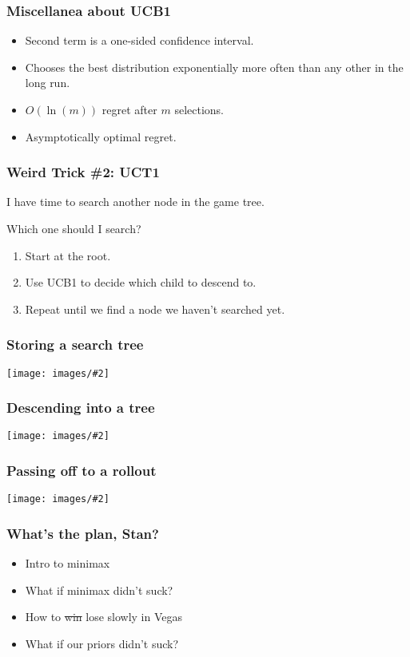 \documentclass[table]{beamer}
\newcommand\img[2]{\texttt{[image: images/\#2]}}
\begin{document}
\begin{frame}
	\frametitle{Miscellanea about UCB1}

	\begin{itemize}
		\item Second term is a one-sided confidence interval.
		\item Chooses the best distribution exponentially more often than
			any other in the long run.
		\item $O(\ln(m))$ regret after $m$ selections.
		\item Asymptotically optimal regret.
	\end{itemize}
\end{frame}

\begin{frame}
	\frametitle{Weird Trick \#2: UCT1}
	I have time to search another node in the game tree.

	Which one should I search?

	\vspace{3ex}

	\begin{enumerate}
		\item Start at the root.
		\item \alert{Use UCB1 to decide which child to descend to.}
		\item Repeat until we find a node we haven't searched yet.
	\end{enumerate}
\end{frame}

\begin{frame}
    \frametitle{Storing a search tree}
    \begin{center}
        \img{1}{mctstree-hs.png}
    \end{center}
\end{frame}

\begin{frame}
    \frametitle{Descending into a tree}
    \begin{center}
        \img{1}{mcts-descend-hs.png}
    \end{center}
\end{frame}

\begin{frame}
    \frametitle{Passing off to a rollout}
    \begin{center}
        \img{1}{mcts-rollout-hs.png}
    \end{center}
\end{frame}

\begin{frame}
	\frametitle{What's the plan, Stan?}
	\begin{itemize}
		\setlength\itemsep{5ex}
		\item Intro to minimax
		\item What if minimax didn't suck?
		\item How to \sout{win} lose slowly in Vegas
		\item \alert{What if our priors didn't suck?}
	\end{itemize}
\end{frame}
\end{document}
